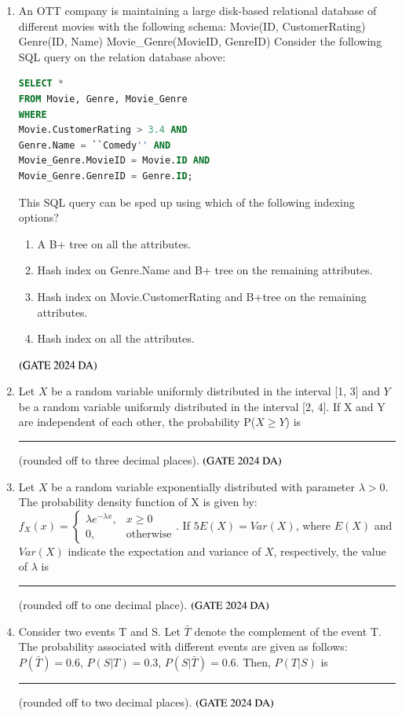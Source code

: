 \documentclass[journal,12pt,onecolumn]{IEEEtran}
\theoremstyle{remark}
\begin{document}
\begin{enumerate}[resume]
\item An OTT company is maintaining a large disk-based relational database of different movies with the following schema:
Movie(ID, CustomerRating)
Genre(ID, Name)
Movie\_Genre(MovieID, GenreID)
Consider the following SQL query on the relation database above:
\begin{lstlisting}[language=SQL]
SELECT *
FROM Movie, Genre, Movie_Genre
WHERE 
Movie.CustomerRating > 3.4 AND
Genre.Name = ``Comedy'' AND
Movie_Genre.MovieID = Movie.ID AND
Movie_Genre.GenreID = Genre.ID;
\end{lstlisting}
This SQL query can be sped up using which of the following indexing options?
\begin{enumerate}
\item A B+ tree on all the attributes.
\item Hash index on Genre.Name and B+ tree on the remaining attributes.
\item Hash index on Movie.CustomerRating and B+tree on the remaining attributes.
\item Hash index on all the attributes.
\end{enumerate}
\hfill $\left(\text{GATE 2024 DA}\right)$


\item Let $X$ be a random variable uniformly distributed in the interval [1, 3] and $Y$ be a random variable uniformly distributed in the interval [2, 4]. If X and Y are independent of each other, the probability P($X \ge Y$) is  \rule{2cm}{0.5mm} (rounded off to three decimal places).
\hfill $\left(\text{GATE 2024 DA}\right)$
\bigskip

\item Let $X$ be a random variable exponentially distributed with parameter $\lambda > 0$. The probability density function of X is given by: $f_X(x) = \begin{cases} \lambda e^{-\lambda x}, & x \ge 0 \\ 0, & \text{otherwise} \end{cases}$. If $5E(X) = Var(X)$, where $E(X)$ and $Var(X)$ indicate the expectation and variance of $X$, respectively, the value of $\lambda$ is  \rule{2cm}{0.5mm} (rounded off to one decimal place).
\hfill $\left(\text{GATE 2024 DA}\right)$


\item Consider two events T and S. Let $\bar{T}$ denote the complement of the event T. The probability associated with different events are given as follows: $P(\bar{T}) = 0.6$, $P(S|T) = 0.3$, $P(S|\bar{T}) = 0.6$. Then, $P(T|S)$ is  \rule{2cm}{0.5mm} (rounded off to two decimal places).
\hfill $\left(\text{GATE 2024 DA}\right)$
\bigskip


\end{enumerate}
\end{document}
